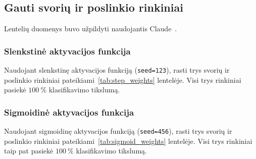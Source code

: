 \subsection{Gauti svorių ir poslinkio rinkiniai}
\label{subsec:rezultatai}

Lentelių duomenys buvo užpildyti naudojantis Claude~\cite{claude_bendrai}.

\subsubsection{Slenkstinė aktyvacijos funkcija}

Naudojant slenkstinę aktyvacijos funkciją (\texttt{seed=123}), rasti trys svorių ir poslinkio rinkiniai pateikiami~\ref{tab:step_weights} lentelėje. Visi trys rinkiniai pasiekė $100\ \%$ klasifikavimo tikslumą.



\subsubsection{Sigmoidinė aktyvacijos funkcija}

Naudojant sigmoidinę aktyvacijos funkciją (\texttt{seed=456}), rasti trys svorių ir poslinkio rinkiniai pateikiami~\ref{tab:sigmoid_weights} lentelėje. Visi trys rinkiniai taip pat pasiekė $100\ \%$ klasifikavimo tikslumą.

